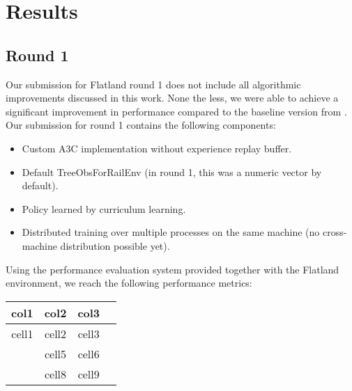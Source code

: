 %
%

\chapter{Results}\label{chap.resultate}
\section{Round 1}
Our submission for Flatland round 1 does not include all algorithmic improvements discussed in this work. None the less, we were able to achieve a significant improvement in performance compared to the baseline version from \cite{flatlandstephan}.
Our submission for round 1 contains the following components:
\begin{itemize}
	\item Custom A3C implementation without experience replay buffer.
	\item Default TreeObsForRailEnv (in round 1, this was a numeric vector by default).
	\item Policy learned by curriculum learning.
	\item Distributed training over multiple processes on the same machine (no cross-machine distribution possible yet).
\end{itemize}
Using the performance evaluation system provided together with the Flatland environment, we reach the following performance metrics:


\begin{tabular}{ |c|c|c|c| } 
	\hline
	\textbf{col1} & \textbf{col2} & \textbf{col3} \\
	\hline
	cell1 & cell2 & cell3 \\ 
	& cell5 & cell6 \\ 
	& cell8 & cell9 \\ 
	\hline
\end{tabular}

